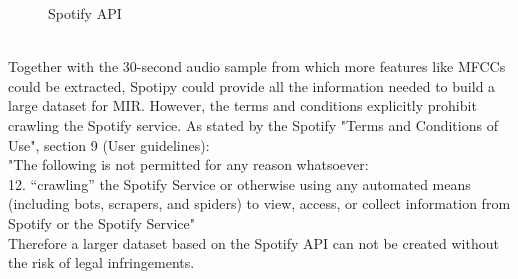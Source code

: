 \begin{figure}[htbp]
	\centering
	\caption{Spotify API}
	\label{fig:spotify}
\end{figure}
\FloatBarrier
\ \\
Together with the 30-second audio sample from which more features like MFCCs could be extracted, Spotipy could provide all the information needed to build a large dataset for MIR. However, the terms and conditions explicitly prohibit crawling the Spotify service. As stated by the Spotify "Terms and Conditions of Use", section 9 (User guidelines):\\
"The following is not permitted for any reason whatsoever:\newline
[...]\\
12. “crawling” the Spotify Service or otherwise using any automated means (including bots, scrapers, and spiders) to view, access, or collect information from Spotify or the Spotify Service"~\cite{spottac1}\\
Therefore a larger dataset based on the Spotify API can not be created without the risk of legal infringements. %
